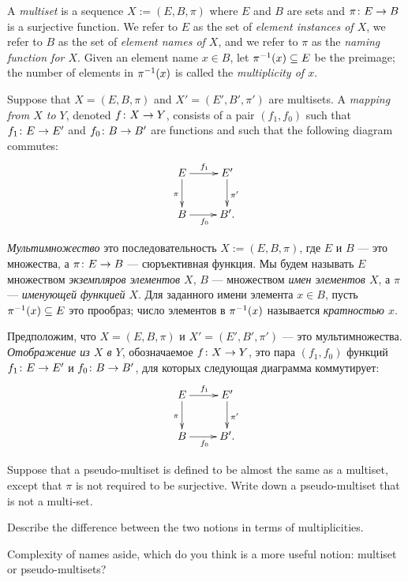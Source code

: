 \documentclass[CT4S-EN-RU]{subfiles}
\begin{document}
\begin{definitionENG}\label{def:multiset}
A {\em multiset} is a sequence $X:=(E,B,\pi)$ where $E$ and $B$ are sets and $\pi\colon E\rightarrow B$ is a surjective function. We refer to $E$ as the set of {\em element instances of $X$}, we refer to $B$ as the set of {\em element names of $X$}, and we refer to $\pi$ as the {\em naming function for $X$}. Given an element name $x\in B$, let $\pi^\m1(x)\ss E$ be the preimage; the number of elements in $\pi^\m1(x)$ is called the {\em multiplicity of $x$}.

Suppose that $X=(E,B,\pi)$ and $X'=(E',B',\pi')$ are multisets. A {\em mapping from $X$ to $Y$}, denoted $f\colon X\rightarrow Y$, consists of a pair $(f_1,f_0)$ such that $f_1\colon E\rightarrow E'$ and $f_0\colon B\rightarrow B'$ are functions and such that the following diagram commutes:
\begin{align}\label{dia:multiset map}
\xymatrix{E\ar[r]^{f_1}\ar[d]_{\pi}&E'\ar[d]^{\pi'}\\B\ar[r]_{f_0}&B'.}
\end{align}
\end{definitionENG}

\begin{definitionRUS}\label{def:multiset}
{\em Мультимножество} это последовательность $X:=(E,B,\pi)$, где $E$ и $B$ — это множества, а $\pi\colon E\rightarrow B$ — сюръективная функция. Мы будем называть $E$ множеством {\em экземпляров элементов $X$}, $B$ — множеством {\em имен элементов $X$}, а $\pi$ — {\em именующей функцией $X$}. Для заданного имени элемента $x\in B$, пусть $\pi^\m1(x)\ss E$ это прообраз; число элементов в $\pi^\m1(x)$ называется {\em кратностью $x$}.

Предположим, что $X=(E,B,\pi)$ и $X'=(E',B',\pi')$ — это мультимножества. {\em Отображение из $X$ в $Y$}, обозначаемое $f\colon X\rightarrow Y$, это пара $(f_1,f_0)$ функций $f_1\colon E\rightarrow E'$ и $f_0\colon B\rightarrow B'$, для которых следующая диаграмма коммутирует:
\begin{align}\label{dia:multiset map}
\xymatrix{E\ar[r]^{f_1}\ar[d]_{\pi}&E'\ar[d]^{\pi'}\\B\ar[r]_{f_0}&B'.}
\end{align}
\end{definitionRUS}

\begin{exerciseENG}
Suppose that a pseudo-multiset is defined to be almost the same as a multiset, except that $\pi$ is not required to be surjective. 
\sexc Write down a pseudo-multiset that is not a multi-set. 
\item Describe the difference between the two notions in terms of multiplicities. 
\item Complexity of names aside, which do you think is a more useful notion: multiset or pseudo-multisets? 
\endsexc
\end{exerciseENG}
\end{document}
